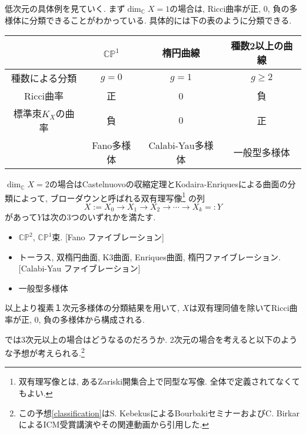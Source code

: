 \documentclass[12pt]{amsart}
\theoremstyle{definition}
\theoremstyle{remark}
\newcommand{\C}{\mathbb{C}}
\begin{document}
低次元の具体例を見ていく. まず$\dim_{\C} X =1$の場合は, Ricci曲率が正, 0, 負の多様体に分類できることがわかっている. 具体的には下の表のように分類できる.

\begin{table}[htb]
  \begin{tabular}{|c||c|c|c|} \hline
 & $\C \mathbb{P}^1$&  楕円曲線 & 種数2以上の曲線  \\ \hline 
種数による分類 & $g=0$&  $g=1$ & $g\ge 2$  \\ \hline 
Ricci曲率& 正&  0 &負  \\ \hline 
標準朿$K_X$の曲率& 負 &  $0$ & 正  \\ \hline 
 & Fano多様体& Calabi-Yau多様体& 一般型多様体  \\ \hline 
  \end{tabular}
\end{table}

$\dim_{\C} X =2$の場合はCastelnuovoの収縮定理とKodaira-Enriquesによる曲面の分類によって, 
ブローダウンと呼ばれる双有理写像\footnote{双有理写像とは, あるZariski開集合上で同型な写像. 全体で定義されてなくてもよい.}
の列
$$
X:=X_{0} \rightarrow X_1 \rightarrow X_2 \rightarrow \cdots \rightarrow X_k =: Y
$$
があって$Y$は次の3つのいずれかを満たす.
\begin{itemize}
\item $\C \mathbb{P}^2$, $\mathbb{C}\mathbb{P}^1$束. [Fano ファイブレーション]
\item トーラス, 双楕円曲面, K3曲面, Enriques曲面, 楕円ファイブレーション. [Calabi-Yau ファイブレーション]
\item 一般型多様体
\end{itemize}
以上より複素１次元多様体の分類結果を用いて, $X$は双有理同値を除いてRicci曲率が正, 0, 負の多様体から構成される.

では3次元以上の場合はどうなるのだろうか. 
2次元の場合を考えると以下のような予想が考えられる.\footnote{この予想\ref{classification}はS. KebekusによるBourbakiセミナーおよびC. BirkarによるICM受賞講演やその関連動画から引用した. }
\end{document}
